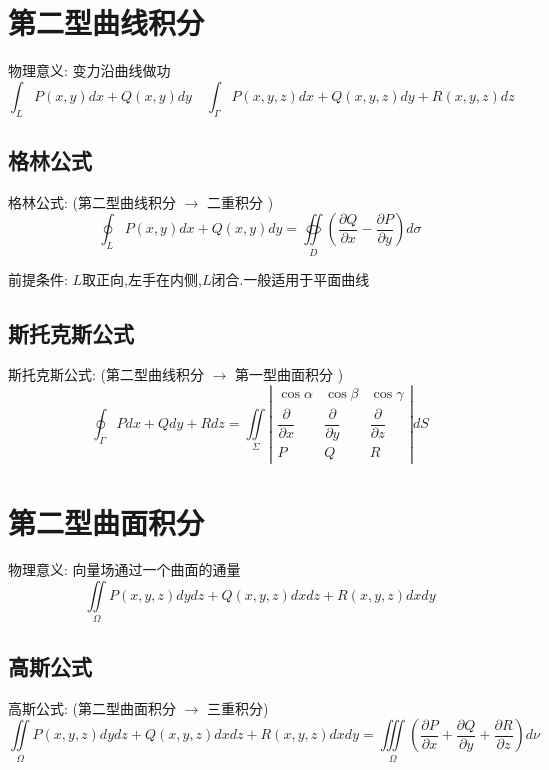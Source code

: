 \section{第二型曲线积分}

\begin{definition}[第二型曲线积分]
	物理意义: 变力沿曲线做功
	$$\int_{L}P(x,y)dx+Q(x,y)dy \quad \int_{\Gamma}P(x,y,z)dx+Q(x,y,z)dy+R(x,y,z)dz$$
\end{definition}
\subsection{格林公式}
\begin{theorem}
	格林公式: (第二型曲线积分 $\rightarrow$ 二重积分 )
	$$\oint_{L}P(x,y)dx+Q(x,y)dy=\oiint\limits_{D}(\frac{\partial Q}{\partial x}-\frac{\partial P}{\partial y})d\sigma$$
	
	前提条件: $L$取正向,左手在内侧,$L$闭合.一般适用于平面曲线
\end{theorem}
\subsection{斯托克斯公式}
\begin{theorem}[斯托克斯公式]
	斯托克斯公式: (第二型曲线积分 $\rightarrow$ 第一型曲面积分 )
	$$\oint_{\Gamma}Pdx+Qdy+Rdz=\iint\limits_{\Sigma}\left| \begin{array}{lll}
		\cos\alpha&\cos\beta&\cos\gamma\\
		\dfrac{\partial}{\partial x}&\dfrac{\partial }{\partial y}&\dfrac{\partial}{\partial z}\\
		P&Q&R
	\end{array}\right|dS $$
\end{theorem}

\section{第二型曲面积分}
\begin{definition}[第二型曲面积分]
	物理意义: 向量场通过一个曲面的通量
	$$\iint\limits_{\Omega}P(x,y,z)dydz+Q(x,y,z)dxdz+R(x,y,z)dxdy$$
\end{definition}
\subsection{高斯公式}
\begin{theorem}[高斯公式]
	高斯公式: (第二型曲面积分 $\rightarrow$ 三重积分)
	$$\iint\limits_{\Omega}P(x,y,z)dydz+Q(x,y,z)dxdz+R(x,y,z)dxdy=\iiint\limits_{\Omega}(\frac{\partial P}{\partial x}+\frac{\partial Q}{\partial y}+\frac{\partial R}{\partial z})d\nu$$
\end{theorem}